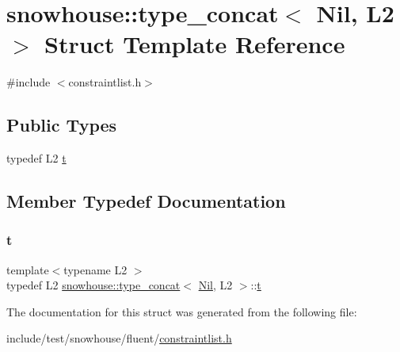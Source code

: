 \hypertarget{structsnowhouse_1_1type__concat_3_01Nil_00_01L2_01_4}{}\section{snowhouse\+::type\+\_\+concat$<$ Nil, L2 $>$ Struct Template Reference}
\label{structsnowhouse_1_1type__concat_3_01Nil_00_01L2_01_4}


{\ttfamily \#include $<$constraintlist.\+h$>$}

\subsection*{Public Types}
\begin{DoxyCompactItemize}
\item 
typedef L2 \mbox{\hyperlink{structsnowhouse_1_1type__concat_3_01Nil_00_01L2_01_4_a4c4adb0f806d940907b19bdaa00d4b9a}{t}}
\end{DoxyCompactItemize}


\subsection{Member Typedef Documentation}
\mbox{\label{structsnowhouse_1_1type__concat_3_01Nil_00_01L2_01_4_a4c4adb0f806d940907b19bdaa00d4b9a}} 
\subsubsection{\texorpdfstring{t}{t}}
{\footnotesize\ttfamily template$<$typename L2 $>$ \\
typedef L2 \mbox{\hyperlink{structsnowhouse_1_1type__concat}{snowhouse\+::type\+\_\+concat}}$<$ \mbox{\hyperlink{structsnowhouse_1_1Nil}{Nil}}, L2 $>$\+::\mbox{\hyperlink{structsnowhouse_1_1type__concat_3_01Nil_00_01L2_01_4_a4c4adb0f806d940907b19bdaa00d4b9a}{t}}}



The documentation for this struct was generated from the following file\+:\begin{DoxyCompactItemize}
\item 
include/test/snowhouse/fluent/\mbox{\hyperlink{constraintlist_8h}{constraintlist.\+h}}\end{DoxyCompactItemize}
